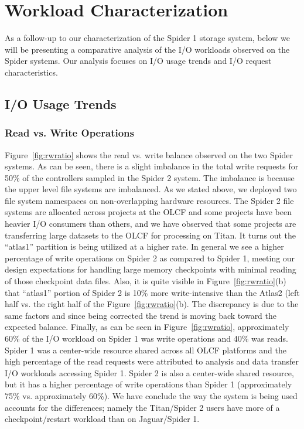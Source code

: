 \section{Workload Characterization}
\label{sec:workloadchar}

As a follow-up to our characterization of the Spider 1 storage system, below we
will be presenting a comparative analysis of the I/O workloads observed on the
Spider systems. Our analysis focuses on I/O usage trends and I/O request
characteristics.


\subsection{I/O Usage Trends}

\subsubsection{Read vs. Write Operations}


Figure~\ref{fig:rwratio} shows the read vs. write balance observed on the two
Spider systems.  As can be seen, there is a slight imbalance in the total write
requests for 50\% of the controllers sampled in the Spider 2 system. The
imbalance is because the upper level file systems are imbalanced. As we stated
above, we deployed two file system namespaces on  non-overlapping hardware
resources. The Spider 2 file systems are allocated across projects at the OLCF and some
projects have been heavier I/O consumers than others, and we have observed that
some projects are transferring large datasets to the OLCF for processing on
Titan. It turns out  the ``atlas1'' partition is being utilized at a higher
rate.  In general we see a higher percentage of write operations on Spider 2 as
compared to Spider 1, meeting our design expectations for handling large
memory checkpoints with  minimal reading of those checkpoint data files. Also,
it is quite visible in Figure~\ref{fig:rwratio}(b) that ``atlas1'' portion of
Spider 2 is 10\% more write-intensive than the Atlas2 (left half vs. the right
half of the Figure~\ref{fig:rwratio}(b).  The discrepancy is due to the same
factors and since being corrected the trend is moving back toward the expected
balance. Finally, as can be seen in Figure~\ref{fig:rwratio}, approximately
60\% of the I/O workload on Spider 1 was write operations and 40\% was reads.
Spider 1 was a center-wide resource shared across all OLCF platforms and the
high percentage of the read requests were attributed to analysis and data
transfer I/O workloads accessing Spider 1. Spider 2 is also a center-wide
shared resource, but it has a higher percentage of write operations than Spider
1 (approximately 75\% vs.  approximately 60\%). We have conclude the way
the system is being used accounts for the differences; namely the Titan/Spider 2 users have
more of a checkpoint/restart workload than on Jaguar/Spider 1.  

